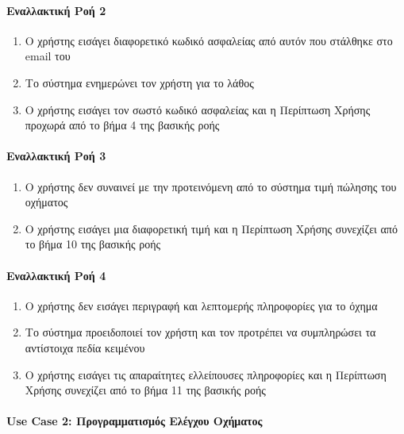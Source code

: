 \documentclass{../ol-softwaremanual}
\begin{document}
	\paragraph{Εναλλακτική Ροή 2}
	
	\begin{enumerate}
		\item O χρήστης εισάγει διαφορετικό κωδικό ασφαλείας από αυτόν που στάλθηκε στο \en email \gr  του
		\item Το σύστημα ενημερώνει τον χρήστη για το λάθος
		\item Ο χρήστης εισάγει τον σωστό κωδικό ασφαλείας και η Περίπτωση Χρήσης προχωρά από το βήμα 4 της βασικής ροής
	\end{enumerate}

	\paragraph{Εναλλακτική Ροή 3}
	
	\begin{enumerate}
		\item O χρήστης δεν συναινεί με την προτεινόμενη από το σύστημα τιμή πώλησης του οχήματος
		\item O χρήστης εισάγει μια διαφορετική τιμή και η Περίπτωση Χρήσης συνεχίζει από το βήμα 10 της βασικής ροής		 
	\end{enumerate}

	\paragraph{Εναλλακτική Ροή 4}
	
	\begin{enumerate}
		\item Ο χρήστης δεν εισάγει περιγραφή και λεπτομερής πληροφορίες για το όχημα
		\item Το σύστημα προειδοποιεί τον χρήστη και τον προτρέπει να συμπληρώσει τα αντίστοιχα πεδία κειμένου
		\item Ο χρήστης εισάγει τις απαραίτητες ελλείπουσες πληροφορίες και η Περίπτωση Χρήσης συνεχίζει από το βήμα 11 της βασικής ροής
	\end{enumerate}
	
	
	\paragraph{\en Use Case 2: \gr Προγραμματισμός Ελέγχου Οχήματος}
	
\end{document}
